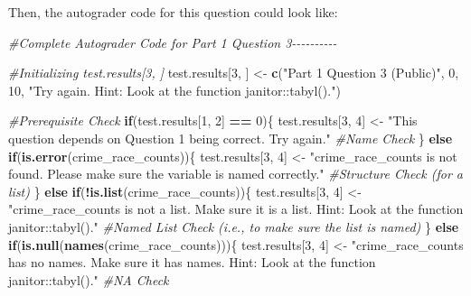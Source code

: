 \documentclass[
  12pt,
]{book}
\newenvironment{Shaded}{\begin{snugshade}}{\end{snugshade}}
\newcommand{\CommentTok}[1]{\textcolor[rgb]{0.56,0.35,0.01}{\textit{#1}}}
\newcommand{\ControlFlowTok}[1]{\textcolor[rgb]{0.13,0.29,0.53}{\textbf{#1}}}
\newcommand{\DecValTok}[1]{\textcolor[rgb]{0.00,0.00,0.81}{#1}}
\newcommand{\FunctionTok}[1]{\textcolor[rgb]{0.13,0.29,0.53}{\textbf{#1}}}
\newcommand{\NormalTok}[1]{#1}
\newcommand{\OtherTok}[1]{\textcolor[rgb]{0.56,0.35,0.01}{#1}}
\newcommand{\SpecialCharTok}[1]{\textcolor[rgb]{0.81,0.36,0.00}{\textbf{#1}}}
\newcommand{\StringTok}[1]{\textcolor[rgb]{0.31,0.60,0.02}{#1}}
\begin{document}
Then, the autograder code for this question could look like:

\begin{Shaded}
\begin{Highlighting}[]
\CommentTok{\#Complete Autograder Code for Part 1 Question 3{-}{-}{-}{-}{-}{-}{-}{-}{-}{-}}

\CommentTok{\#Initializing \textasciigrave{}test.results[3, ]\textasciigrave{}}
\NormalTok{test.results[}\DecValTok{3}\NormalTok{, ] }\OtherTok{\textless{}{-}} \FunctionTok{c}\NormalTok{(}\StringTok{"Part 1 Question 3 (Public)"}\NormalTok{, }\DecValTok{0}\NormalTok{, }\DecValTok{10}\NormalTok{, }\StringTok{"Try again. Hint: Look at the function \textasciigrave{}janitor::tabyl()\textasciigrave{}."}\NormalTok{)}
  
\CommentTok{\#Prerequisite Check}
\ControlFlowTok{if}\NormalTok{(test.results[}\DecValTok{1}\NormalTok{, }\DecValTok{2}\NormalTok{] }\SpecialCharTok{==} \DecValTok{0}\NormalTok{)\{}
\NormalTok{  test.results[}\DecValTok{3}\NormalTok{, }\DecValTok{4}\NormalTok{] }\OtherTok{\textless{}{-}} \StringTok{"This question depends on Question 1 being correct. Try again."}
\CommentTok{\#Name Check}
\NormalTok{\} }\ControlFlowTok{else} \ControlFlowTok{if}\NormalTok{(}\FunctionTok{is.error}\NormalTok{(crime\_race\_counts))\{ }
\NormalTok{  test.results[}\DecValTok{3}\NormalTok{, }\DecValTok{4}\NormalTok{] }\OtherTok{\textless{}{-}} \StringTok{"\textasciigrave{}crime\_race\_counts\textasciigrave{} is not found. Please make sure the variable is named correctly."}
\CommentTok{\#Structure Check (for a list)}
\NormalTok{\} }\ControlFlowTok{else} \ControlFlowTok{if}\NormalTok{(}\SpecialCharTok{!}\FunctionTok{is.list}\NormalTok{(crime\_race\_counts))\{}
\NormalTok{  test.results[}\DecValTok{3}\NormalTok{, }\DecValTok{4}\NormalTok{] }\OtherTok{\textless{}{-}} \StringTok{"\textasciigrave{}crime\_race\_counts\textasciigrave{} is not a list. Make sure it is a list. Hint: Look at the function \textasciigrave{}janitor::tabyl()\textasciigrave{}."}
\CommentTok{\#Named List Check (i.e., to make sure the list is named)}
\NormalTok{\} }\ControlFlowTok{else} \ControlFlowTok{if}\NormalTok{(}\FunctionTok{is.null}\NormalTok{(}\FunctionTok{names}\NormalTok{(crime\_race\_counts)))\{}
\NormalTok{    test.results[}\DecValTok{3}\NormalTok{, }\DecValTok{4}\NormalTok{] }\OtherTok{\textless{}{-}} \StringTok{"\textasciigrave{}crime\_race\_counts\textasciigrave{} has no names. Make sure it has names. Hint: Look at the function \textasciigrave{}janitor::tabyl()\textasciigrave{}."}
\CommentTok{\#NA Check}

\end{Highlighting}
\end{Shaded}
\end{document}
